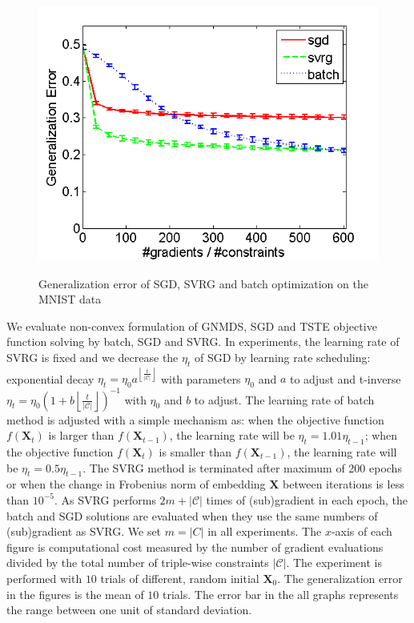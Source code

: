 \documentclass[letterpaper]{article}
\begin{document}
\begin{figure}
{				\includegraphics[scale=0.33]{MNIST_TSTE_200_test.png}
			}
			\caption{Generalization error of SGD, SVRG and batch optimization on the MNIST data}
			\label{fig:2} %
		\end{figure}

		We evaluate non-convex formulation of GNMDS, SGD and TSTE objective function solving by batch, SGD and SVRG. In experiments, the learning rate of SVRG is fixed and we decrease the $\eta_t$ of SGD by learning rate scheduling: exponential decay $\eta_t = \eta_0 a^{\left \lfloor \frac{t}{|\mathcal{C}|} \right \rfloor}$ with parameters $\eta_0$ and $a$ to adjust and t-inverse $\eta_t = \eta_0(1 + b\left \lfloor \frac{t}{|\mathcal{C}|} \right \rfloor)^{-1}$ with $\eta_0$ and $b$ to adjust. The learning rate of batch method is adjusted with a simple mechanism as: when the objective function $f(\mathbf{X}_t)$ is larger than $f(\mathbf{X}_{t-1})$, the learning rate will be $\eta_t=1.01\eta_{t-1}$; when the objective function $f(\mathbf{X}_t)$ is smaller than $f(\mathbf{X}_{t-1})$, the learning rate will be $\eta_t=0.5\eta_{t-1}$. 
		The SVRG method is terminated after maximum of 200 epochs or when the change in Frobenius norm of embedding $\mathbf{X}$ between iterations is less than $10^{-5}$. As SVRG performs $2m+|\mathcal{C}|$ times of (sub)gradient in each epoch, the batch and SGD solutions are evaluated when they use the same numbers of (sub)gradient as SVRG. We set $m=|C|$ in all experiments. The $x$-axis of each figure is computational cost measured by the number of gradient evaluations divided by the total number of triple-wise constraints $|\mathcal{C}|$. The experiment is performed with $10$ trials of different, random initial $\mathbf{X}_0$. The generalization error in the figures is the mean of $10$ trials. The error bar in the all graphs represents the range between one unit of standard deviation.
\end{document}
